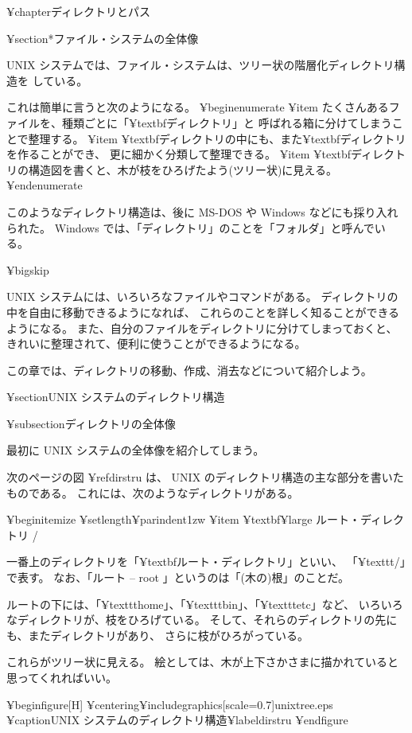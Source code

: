 ¥chapter{ディレクトリとパス}

¥section*{ファイル・システムの全体像}

 UNIX システムでは、ファイル・システムは、ツリー状の階層化ディレクトリ構造を
している。

これは簡単に言うと次のようになる。
¥begin{enumerate}
¥item たくさんあるファイルを、種類ごとに「¥textbf{ディレクトリ}」と
呼ばれる箱に分けてしまうことで整理する。
¥item ¥textbf{ディレクトリ}の中にも、また¥textbf{ディレクトリ}を作ることができ、
更に細かく分類して整理できる。
¥item ¥textbf{ディレクトリ}の構造図を書くと、木が枝をひろげたよう(ツリー状)に見える。
¥end{enumerate}

このようなディレクトリ構造は、後に MS-DOS や Windows などにも採り入れられた。
 Windows では、「ディレクトリ」のことを「フォルダ」と呼んでいる。

¥bigskip

 UNIX システムには、いろいろなファイルやコマンドがある。
ディレクトリの中を自由に移動できるようになれば、
これらのことを詳しく知ることができるようになる。
また、自分のファイルをディレクトリに分けてしまっておくと、
きれいに整理されて、便利に使うことができるようになる。

この章では、ディレクトリの移動、作成、消去などについて紹介しよう。

¥section{UNIX システムのディレクトリ構造}

¥subsection{ディレクトリの全体像}

最初に UNIX システムの全体像を紹介してしまう。

次のページの図 ¥ref{dirstru} は、 UNIX のディレクトリ構造の主な部分を書いた
ものである。
これには、次のようなディレクトリがある。

¥begin{itemize}
¥setlength{¥parindent}{1zw}
¥item ¥textbf{¥large ルート・ディレクトリ /}

一番上のディレクトリを「¥textbf{ルート・ディレクトリ}」といい、
「¥texttt{/}」で表す。
なお、「ルート -- root 」というのは「(木の)根」のことだ。

ルートの下には、「¥texttt{home}」、「¥texttt{bin}」、「¥texttt{etc}」など、
いろいろなディレクトリが、枝をひろげている。
そして、それらのディレクトリの先にも、またディレクトリがあり、
さらに枝がひろがっている。

これらがツリー状に見える。
絵としては、木が上下さかさまに描かれていると思ってくれればいい。

¥begin{figure}[H]
¥centering{¥includegraphics[scale=0.7]{unixtree.eps}}
¥caption{UNIX システムのディレクトリ構造}¥label{dirstru}
¥end{figure}

